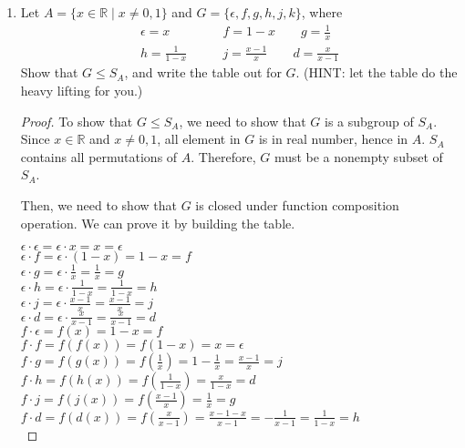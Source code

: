 \documentclass[12pt]{article}
\newcommand{\R}{\mathbb{R}}
\begin{document}
\begin{enumerate}
\begin{proof}
        Then, let $y \in B$, and we need to show that there exists an $x$ in $A$ such that $f(x) = y$.
        Since, $g$ is from $B$ to $A$, there is $x$ such that $g(y) = x$. Then, by the condition, we will have $f(x) = y$. Therefore, $f$ is surjective and hence bijective.\\
        
        We know that $f(x) = f(g(y)) = y$ and $g(f(x)) = g(y) = x$. If $x=y$, then $ f(g(y))  = g(f(x)) = y = x$, which implies that $g = f^{-1}$.
     \end{proof}
      
        
        \item Let $A = \{x \in \R \mid x \neq 0, 1\}$ and $G = \{\epsilon, f , g, h, j, k\}$, where
            \begin{align*}
               \epsilon = x \qquad &f = 1 − x \qquad g = \frac{1}{x}\\
               h = \frac{1}{1-x} \qquad &j = \frac{x-1}{x} \qquad d = \frac{x}{x-1}
            \end{align*}
        Show that $G \leq S_A$, and write the table out for $G$. ({\large H}INT: let the table do the heavy lifting for you.)
        
        \begin{proof}
            To show that $G \leq S_A$, we need to show that $G$ is a subgroup of $S_A$. Since $x \in \R$ and $x \neq 0,1$, all element in $G$ is in real number, hence in $A$.
            $S_A$ contains all permutations of $A$. Therefore, $G$ must be a nonempty subset of $S_A$.             

Then, we need to show that $G$ is closed under function composition operation. We can prove it by building the table.


$\epsilon \cdot \epsilon =\epsilon \cdot x = x = \epsilon$\\
$\epsilon \cdot f = \epsilon \cdot (1-x) = 1-x = f$\\
$\epsilon \cdot g =\epsilon \cdot \frac{1}{x} = \frac{1}{x} =g$\\
$\epsilon \cdot h =\epsilon \cdot \frac{1}{1-x} = \frac{1}{1-x} = h$\\
$\epsilon \cdot j =\epsilon \cdot \frac{x-1}{x} = \frac{x-1}{x} =j$\\
$\epsilon \cdot d =\epsilon \cdot \frac{x}{x-1} = \frac{x}{x-1} = d$ \\

$f \cdot \epsilon = f(x) = 1-x =f$ \\
$f \cdot f = f(f(x)) = f(1-x) = x = \epsilon$\\
$f \cdot g = f(g(x)) = f(\frac{1}{x}) = 1-\frac{1}{x} = \frac{x-1}{x} = j$\\
$f \cdot h = f(h(x)) = f(\frac{1}{1-x}) = \frac{x}{1-x} = d$\\
$f \cdot j = f(j(x)) = f(\frac{x-1}{x}) = \frac{1}{x} = g$\\
$f \cdot d = f(d(x)) = f(\frac{x}{x-1}) = \frac{x-1-x}{x-1} = -\frac{1}{x-1} =\frac{1}{1-x}=h$\\


\end{proof}
\end{enumerate}
\end{document}
